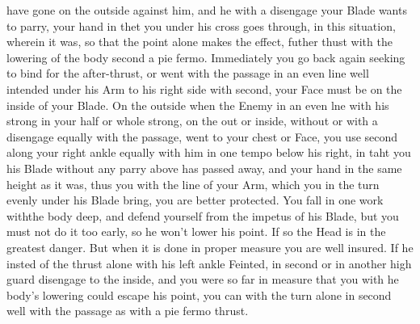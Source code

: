 have gone on the outside against him, and he with a disengage your
Blade wants to parry, your hand in thet you under his cross goes
through, in this situation, wherein it was, so that the point alone
makes the effect, futher thust with the lowering of the body second a
pie fermo.
Immediately you go back again seeking to bind for the after-thrust, or
went with the passage in an even line well intended under his
Arm to his right side with second, your Face must be on the inside of
your Blade. On the outside when the Enemy in an even lne with his
strong in your half or whole strong, on the out or inside, without or
with a disengage equally with the passage,
went to your chest or Face, you use second along your right
ankle equally
with him in one tempo below his right, in taht you his Blade without
any parry above has passed away, and your hand in the same height as
it was, thus you with the line of your Arm, which you in the turn
evenly under his Blade bring, you are better protected.
You fall in one work withthe body deep, and defend yourself from the
impetus of his Blade, but you must not do it too early, so he won't
lower his point. If so the Head is in the greatest danger. But when it
is done in proper measure you are well insured.
If he insted of the thrust alone with his left ankle Feinted, in
second or in another high guard disengage to the inside, and you were
so far in measure that you with he body's lowering could escape his
point, you can with the turn alone in second well with the passage as
with a pie fermo thrust.

